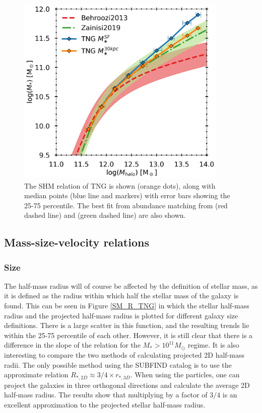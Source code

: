 \begin{figure}
    \centering
    \includegraphics[width=0.9\textwidth]{images/shmr.png}
    \caption{The SHM relation of TNG is shown (orange dots), along with median points (blue line and markers) with error bars showing the 25-75 percentile. The best fit from abundance matching from \textcite{Behroozi2013} (red dashed line) and \textcite{Zanisi2019} (green dashed line) are also shown.}
    \label{shmr}
\end{figure}

\subsection{Mass-size-velocity relations}

\subsubsection{Size}
The half-mass radius will of course be affected by the definition of stellar mass, as it is defined as the radius within which half the stellar mass of the galaxy is found. This can be seen in Figure \ref{SM_R_TNG} in which the stellar half-mass radius and the projected half-mass radius is plotted for different galaxy size definitions. There is a large scatter in this function, and the resulting trends lie within the 25-75 percentile of each other. However, it is still clear that there is a difference in the slope of the relation for the $M_\ast > 10^{11} M_{\odot}$ regime. It is also interesting to compare the two methods of calculating projected 2D half-mass radii. The only possible method using the SUBFIND catalog is to use the approximate relation $R_{\ast, 2D} \approx 3/4 \times r_{\ast, 3D}$. When using the particles, one can project the galaxies in three orthogonal directions and calculate the average 2D half-mass radius. The results show that multiplying by a factor of $3/4$ is an excellent approximation to the projected stellar half-mass radius.

